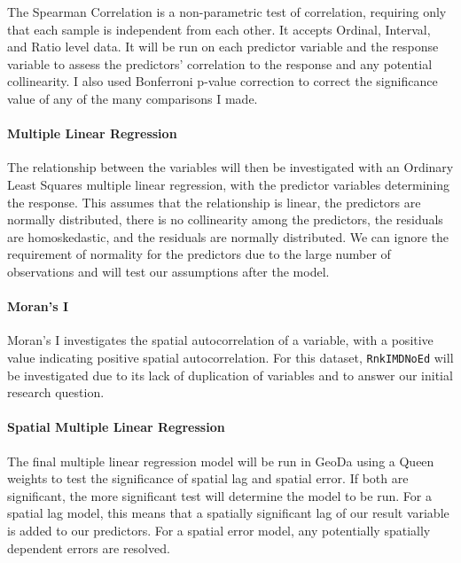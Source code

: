 \documentclass[
  letterpaper,
  DIV=11,
  numbers=noendperiod,
  oneside]{scrartcl}
\let\oldparagraph\paragraph
\renewcommand{\paragraph}[1]{\oldparagraph{#1}\mbox{}}
\begin{document}
The Spearman Correlation is a non-parametric test of correlation,
requiring only that each sample is independent from each other. It
accepts Ordinal, Interval, and Ratio level data. It will be run on each
predictor variable and the response variable to assess the predictors'
correlation to the response and any potential collinearity. I also used
Bonferroni p-value correction to correct the significance value of any
of the many comparisons I made.

\hypertarget{multiple-linear-regression}{%
\paragraph{Multiple Linear
Regression}\label{multiple-linear-regression}}

The relationship between the variables will then be investigated with an
Ordinary Least Squares multiple linear regression, with the predictor
variables determining the response. This assumes that the relationship
is linear, the predictors are normally distributed, there is no
collinearity among the predictors, the residuals are homoskedastic, and
the residuals are normally distributed. We can ignore the requirement of
normality for the predictors due to the large number of observations and
will test our assumptions after the model.

\hypertarget{morans-i}{%
\paragraph{Moran's I}\label{morans-i}}

Moran's I investigates the spatial autocorrelation of a variable, with a
positive value indicating positive spatial autocorrelation. For this
dataset, \texttt{RnkIMDNoEd} will be investigated due to its lack of
duplication of variables and to answer our initial research question.

\hypertarget{spatial-multiple-linear-regression}{%
\paragraph{Spatial Multiple Linear
Regression}\label{spatial-multiple-linear-regression}}

The final multiple linear regression model will be run in GeoDa using a
Queen weights to test the significance of spatial lag and spatial error.
If both are significant, the more significant test will determine the
model to be run. For a spatial lag model, this means that a spatially
significant lag of our result variable is added to our predictors. For a
spatial error model, any potentially spatially dependent errors are
resolved.
\end{document}
